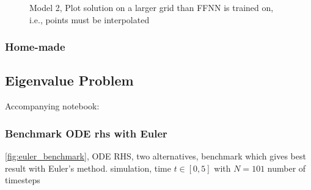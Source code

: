 \begin{figure}[H]
\caption{Model 2, Plot solution on a larger grid than FFNN is trained on, i.e., points must be interpolated}
\label{fig:heat_nn4}
\end{figure}

\subsubsection{Home-made}


\subsection{Eigenvalue Problem}\label{sec:eigenvalue results}

Accompanying notebook: 


\subsubsection*{Benchmark ODE rhs with Euler}

\autoref{fig:euler_benchmark}, ODE RHS, two alternatives, benchmark which gives best result with Euler's method. simulation, time $t\in [0, 5]$ with $N = 101$ number of timesteps

